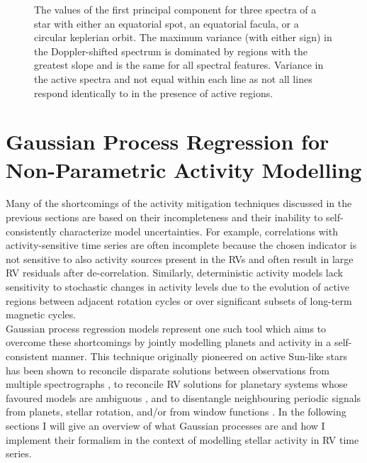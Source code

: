\begin{figure}
  \centering
  \caption[Principal component analysis of idealized spectra containing either spots, faculae, or planets.]
          {The values of the first principal component for three spectra of a star with either an equatorial
            spot, an equatorial facula, or a circular keplerian orbit. The maximum variance (with either sign)
            in the Doppler-shifted spectrum is dominated by regions with the greatest slope and is the same
            for all spectral features. Variance in the active spectra and not equal within each line as not all
            lines respond identically to in the presence of active regions. \citep[Image credit:][]{davis17}}
  \label{fig:pca}
\end{figure}


\section{Gaussian Process Regression for Non-Parametric Activity Modelling} \label{sect:gp}
Many of the shortcomings of the activity mitigation techniques discussed in the
previous sections are based on their incompleteness and their inability to
self-consistently characterize model uncertainties. For example, correlations with
activity-sensitive time series are often incomplete because the chosen indicator
is not sensitive to also activity sources present in the RVs and often result in
large RV residuals after de-correlation. Similarly, deterministic activity models
lack sensitivity to stochastic changes in activity levels due to the evolution
of active regions between adjacent rotation cycles or over
significant subsets of long-term magnetic cycles. \\

Gaussian process regression models represent one such tool which aims to overcome
these shortcomings by jointly modelling planets and activity in a self-consistent
manner. This technique originally pioneered on active Sun-like stars
\citep[e.g.][]{haywood14,grunblatt15,faria16,lopezmorales16}
has been shown to reconcile disparate solutions
between observations from multiple spectrographs \citep{rajpaul17,cloutier19},
to reconcile RV solutions for planetary systems whose favoured models are
ambiguous \citep{rajpaul17,cloutier19}, and to disentangle neighbouring periodic
signals from planets, stellar rotation, and/or from window functions
\citep{rajpaul16,cloutier17b}.
In the following sections I will give an overview
of what Gaussian processes are and how I implement their formalism in the context
of modelling stellar activity in RV time series.

